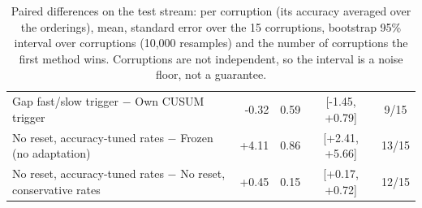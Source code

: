 \begin{table}[t]
\begin{tabular}{@{}lrrcc@{}}
    Gap fast/slow trigger $-$ Own CUSUM trigger & -0.32 & 0.59 & [-1.45, +0.79] & 9/15 \\
    No reset, accuracy-tuned rates $-$ Frozen (no adaptation) & +4.11 & 0.86 & [+2.41, +5.66] & 13/15 \\
    No reset, accuracy-tuned rates $-$ No reset, conservative rates & +0.45 & 0.15 & [+0.17, +0.72] & 12/15 \\
    \bottomrule
  \end{tabular}
  \caption{Paired differences on the test stream: per corruption (its accuracy averaged over the orderings), mean, standard error over the 15 corruptions, bootstrap 95\% interval over corruptions (10,000 resamples) and the number of corruptions the first method wins. Corruptions are not independent, so the interval is a noise floor, not a guarantee.}
  \label{tab:final_paired}
\end{table}
